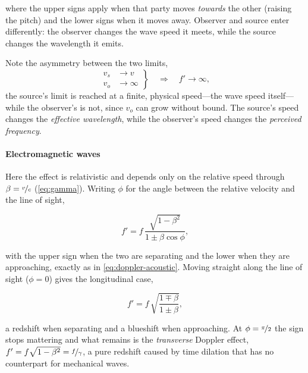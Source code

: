         where the upper signs apply when that party moves \emph{towards} the other (raising the pitch) and the lower signs when it moves away. Observer and source enter differently: the observer changes the wave speed it meets, while the source changes the wavelength it emits.

        Note the asymmetry between the two limits,
        \begin{equation}
            \left.
            \begin{aligned}
                v_s &\to v      \\
                v_o &\to \infty
            \end{aligned}
            \right\}
            \quad\Longrightarrow\quad
            f' \to \infty,
        \end{equation}
        the source's limit is reached at a finite, physical speed---the wave speed itself---while the observer's is not, since $v_o$ can grow without bound. The source's speed changes the \emph{effective wavelength}, while the observer's speed changes the \emph{perceived frequency}.

        \paragraph{Electromagnetic waves}

        Here the effect is relativistic and depends only on the relative speed through $\beta = \nicefrac{v}{c}$ (\cref{eq:gamma}). Writing $\phi$ for the angle between the relative velocity and the line of sight,

        \begin{equation}\label{eq:doppler-em}
            f' = f\,\frac{\sqrt{1-\beta^{2}}}{1 \pm \beta\cos{\phi}},
        \end{equation}

        with the upper sign when the two are separating and the lower when they are approaching, exactly as in \cref{eq:doppler-acoustic}. Moving straight along the line of sight ($\phi = 0$) gives the longitudinal case,

        \begin{equation*}
            f' = f\,\sqrt{\frac{1\mp\beta}{1\pm\beta}},
        \end{equation*}

        a redshift when separating and a blueshift when approaching. At $\phi = \nicefrac{\pi}{2}$ the sign stops mattering and what remains is the \emph{transverse} Doppler effect, $f' = f\sqrt{1-\beta^{2}} = \nicefrac{f}{\gamma}$, a pure redshift caused by time dilation that has no counterpart for mechanical waves.

